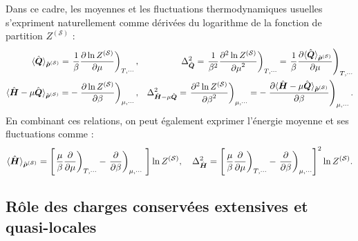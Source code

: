 Dans ce cadre, les moyennes et les fluctuations thermodynamiques usuelles s’expriment naturellement comme dérivées du logarithme de la fonction de partition $Z^{(\mathcal{S})}$ :
\begin{eqnarray}
	\langle \hat{\bm{Q}} \rangle_{\hat{\bm{\rho}}^{(\mathcal{S})}}  = \left .\frac{1}{\beta} \frac{ \partial \ln Z^{(\mathcal{S})}}{\partial \mu } \right )_{T,\cdots},  & & \Delta^2_{\hat{\bm{Q}}} = \left . \frac{1}{\beta^2} \frac{ \partial^2 \ln Z^{(\mathcal{S})}}{{\partial \mu}^2 } \right )_{T,\cdots} =  \left . \frac{1}{\beta} \frac{ \partial \langle \hat{\bm{Q}} \rangle_{\hat{\bm{\rho}}^{(\mathcal{S})}}}{\partial \mu } \right )_{T,\cdots}\\
	\langle \hat{\bm{H}} - \mu\hat{\bm{Q}}  \rangle_{\hat{\bm{\rho}}^{(\mathcal{S})}}  = -\left . \frac{ \partial \ln Z^{(\mathcal{S})}}{\partial \beta } \right )_{\mu , \cdots} ,  & & \Delta^2_{\hat{\bm{H}} - \mu\hat{\bm{Q}}} = \left .  \frac{ \partial^2 \ln Z^{(\mathcal{S})}}{{\partial \beta}^2 } \right )_{\mu , \cdots} =  -\left .  \frac{ \partial \langle \hat{\bm{H}} - \mu\hat{\bm{Q}} \rangle_{\hat{\bm{\rho}}^{(\mathcal{S})}}}{\partial \beta } \right )_{\mu , \cdots}.		
\end{eqnarray}
En combinant ces relations, on peut également exprimer l’énergie moyenne et ses fluctuations comme :
\begin{eqnarray}
	\langle \operator{H} \rangle_{\operator{\rho}^{(\mathcal{S})}}  = \left [ \left .\frac{\mu}{\beta} \frac{ \partial}{\partial \mu } \right )_{T,\cdots} -\left . \frac{ \partial }{\partial \beta } \right )_{\mu, \cdots}   \right ]\ln Z^{(\mathcal{S})},  \quad  \Delta^2_{\operator{H} } = \left [ \left .\frac{\mu}{\beta} \frac{ \partial}{\partial \mu } \right )_{T,\cdots} -\left . \frac{ \partial }{\partial \beta } \right )_{\mu,\cdots}  \right ]^2\ln Z^{(\mathcal{S})}.		
\end{eqnarray}






%
\subsection{Rôle des charges conservées extensives et quasi-locales}


